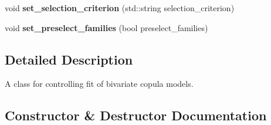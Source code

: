 \begin{DoxyCompactItemize}
\item 
void {\bfseries set\+\_\+selection\+\_\+criterion} (std\+::string selection\+\_\+criterion)\hypertarget{classvinecopulib_1_1_fit_controls_bicop_a52c187e5fcf047825ced777d73483df1}{}\label{classvinecopulib_1_1_fit_controls_bicop_a52c187e5fcf047825ced777d73483df1}

\item 
void {\bfseries set\+\_\+preselect\+\_\+families} (bool preselect\+\_\+families)\hypertarget{classvinecopulib_1_1_fit_controls_bicop_a7850b5ba8acaf78109d00789d93cc876}{}\label{classvinecopulib_1_1_fit_controls_bicop_a7850b5ba8acaf78109d00789d93cc876}

\end{DoxyCompactItemize}



\subsection{Detailed Description}
A class for controlling fit of bivariate copula models. 

\subsection{Constructor \& Destructor Documentation}
